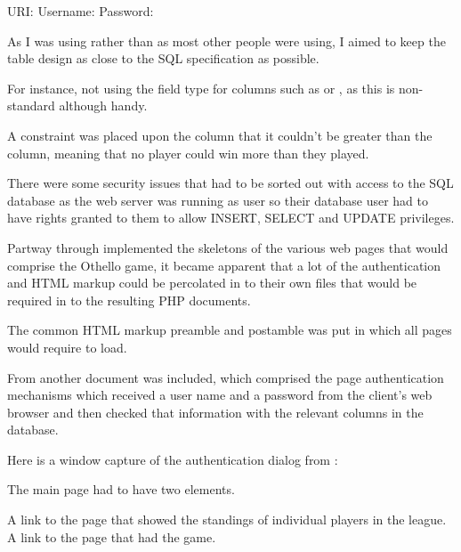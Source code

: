 \subitems	URI: 
\subitems	Username: 
\subitems	Password: 


\items	As I was using  rather than  as most other people were using, I aimed to keep the table design as close to the SQL specification as possible.

\subitems For instance, not using the  field type for columns such as  or , as this is non-standard although handy.


\items	A constraint was placed upon the  column that it couldn't be greater than the  column, meaning that no player could win more than they played.

\items	There were some security issues that had to be sorted out with access to the SQL database as the web server was running as user  so their database user had to have rights granted to them to allow INSERT, SELECT and UPDATE privileges.


\items	Partway through implemented the skeletons of the various web pages that would comprise the Othello game, it became apparent that a lot of the authentication and HTML markup could be percolated in to their own files that would be required in to the resulting PHP documents.

\items	The common HTML markup preamble and postamble was put in  which all pages would require to load.


\items	From  another document was included, which comprised the page authentication mechanisms which received a user name and a password from the client's web browser and then checked that information with the relevant columns in the database.


\items	Here is a window capture of the authentication dialog from :



\items	The main page had to have two elements.

\subitems	A link to the page that showed the standings of individual players in the league.
\subitems	A link to the page that had the game.


